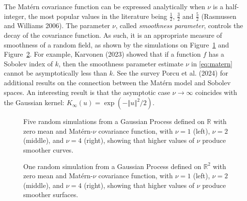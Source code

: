 \documentclass[
  12pt,
]{interact}
\theoremstyle{plain}
\begin{document}
The Matérn covariance function can be expressed analytically when
\(\nu\) is a half-integer, the most popular values in the literature
being \(\frac{1}{2}\), \(\frac{3}{2}\) and \(\frac{5}{2}\) (Rasmussen
and Williams 2006). The parameter \(\nu\), called \emph{smoothness
parameter}, controls the decay of the covariance function. As such, it
is an appropriate measure of smoothness of a random field, as shown by
the simulations on Figure~\ref{fig-matern-1d} and
Figure~\ref{fig-matern-2d}. For example, Karvonen (2023) showed that if
a function \(f\) has a Sobolev index of \(k\), then the smoothness
parameter estimate \(\nu\) in \eqref{eq:matern} cannot be asymptotically
less than \(k\). See the survey Porcu et al. (2024) for additional
results on the connection between the Matérn model and Sobolev spaces.
An interesting result is that the asymptotic case
\(\nu\rightarrow\infty\) coincides with the Gaussian kernel:
\(K_\infty(u)=\exp(-{\left\Vert u\right\Vert}^{2}/2)\).

\begin{figure}


\caption{\label{fig-matern-1d}Five random simulations from a Gaussian
Process defined on \(\mathbb{R}\) with zero mean and Matérn-\(\nu\)
covariance function, with \(\nu=1\) (left), \(\nu=2\) (middle), and
\(\nu=4\) (right), showing that higher values of \(\nu\) produce
smoother curves.}

\end{figure}%

\begin{figure}


\caption{\label{fig-matern-2d}One random simulation from a Gaussian
Process defined on \(\mathbb{R}^2\) with zero mean and Matérn-\(\nu\)
covariance function, with \(\nu=1\) (left), \(\nu=2\) (middle), and
\(\nu=4\) (right), showing that higher values of \(\nu\) produce
smoother surfaces.}

\end{figure}%
\end{document}
